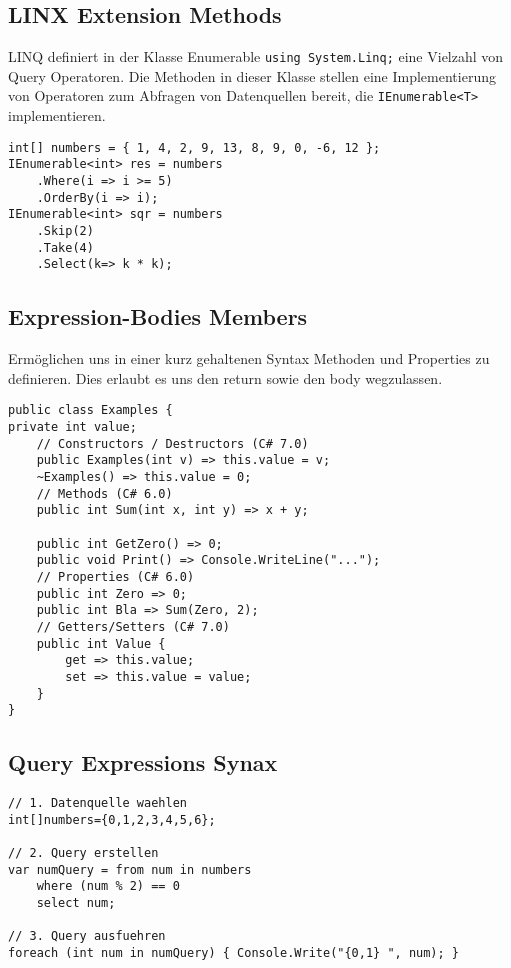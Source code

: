 \subsection{LINX Extension Methods}
LINQ definiert in der Klasse Enumerable \lstinline{using System.Linq;} eine Vielzahl von Query Operatoren. Die Methoden in dieser Klasse stellen eine Implementierung von Operatoren zum Abfragen von Datenquellen bereit, die \lstinline{IEnumerable<T>} implementieren.

\begin{lstlisting}
int[] numbers = { 1, 4, 2, 9, 13, 8, 9, 0, -6, 12 };
IEnumerable<int> res = numbers
	.Where(i => i >= 5) 
	.OrderBy(i => i);
IEnumerable<int> sqr = numbers
	.Skip(2) 
	.Take(4) 
	.Select(k=> k * k);

\end{lstlisting} 

\subsection{Expression-Bodies Members}
Ermöglichen uns in einer kurz gehaltenen Syntax Methoden und Properties zu definieren. Dies erlaubt es uns den return sowie den body wegzulassen.

\begin{lstlisting}
public class Examples {
private int value;
	// Constructors / Destructors (C# 7.0) 
	public Examples(int v) => this.value = v;
	~Examples() => this.value = 0;
	// Methods (C# 6.0) 
	public int Sum(int x, int y) => x + y;
	
	public int GetZero() => 0; 
	public void Print() => Console.WriteLine("...");
	// Properties (C# 6.0) 
	public int Zero => 0; 
	public int Bla => Sum(Zero, 2);
	// Getters/Setters (C# 7.0) 
	public int Value {
		get => this.value; 
		set => this.value = value;
	}
}
\end{lstlisting}

\subsection{Query Expressions Synax}
\begin{lstlisting}
// 1. Datenquelle waehlen
int[]numbers={0,1,2,3,4,5,6};

// 2. Query erstellen
var numQuery = from num in numbers 
	where (num % 2) == 0
	select num;

// 3. Query ausfuehren
foreach (int num in numQuery) { Console.Write("{0,1} ", num); }	
\end{lstlisting}

